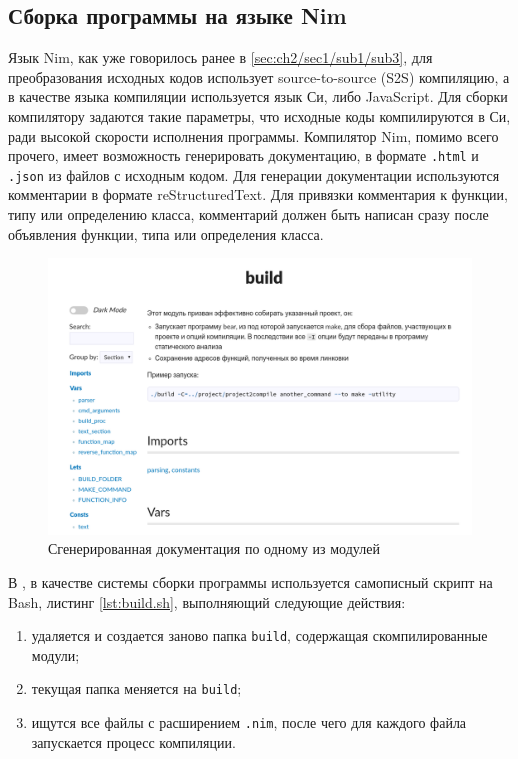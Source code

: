 \subsection{Сборка программы на языке Nim}\label{sec:ch3/sec1/sub1}
Язык Nim, как уже говорилось ранее в \autoref{sec:ch2/sec1/sub1/sub3}, для преобразования
исходных кодов использует source-to-source (S2S) компиляцию, а в качестве языка компиляции
используется язык Си, либо JavaScript. Для сборки {\ProgModule} компилятору задаются 
такие параметры, что исходные коды компилируются в Си, ради высокой скорости исполнения
программы.
Компилятор Nim, помимо всего прочего, имеет возможность генерировать документацию, в формате
\verb|.html| и \verb|.json| из файлов с исходным кодом.
Для генерации документации используются комментарии в формате reStructuredText.
Для привязки комментария к функции, типу или определению класса,
комментарий должен быть написан сразу после объявления функции,
типа или определения класса.

\begin{figure}[!hbtp]
    \includegraphics[width=\textwidth,height=\textheight,keepaspectratio]{images/nim_doc_gen.png}
    \caption{Сгенерированная документация по одному из модулей {\ProgModule}\label{fig:nim-doc-gen}}
\end{figure}


В {\ProgModule}, в качестве системы сборки программы используется самописный скрипт на Bash, листинг \autoref{lst:build.sh}, выполняющий следующие действия:
\begin{enumerate}[label={\arabic*)}]
    \item удаляется и создается заново папка \verb|build|, содержащая скомпилированные модули;
    \item текущая папка меняется на \verb|build|;
    \item ищутся все файлы с расширением \verb|.nim|, после чего для каждого файла
        запускается процесс компиляции.
\end{enumerate}

